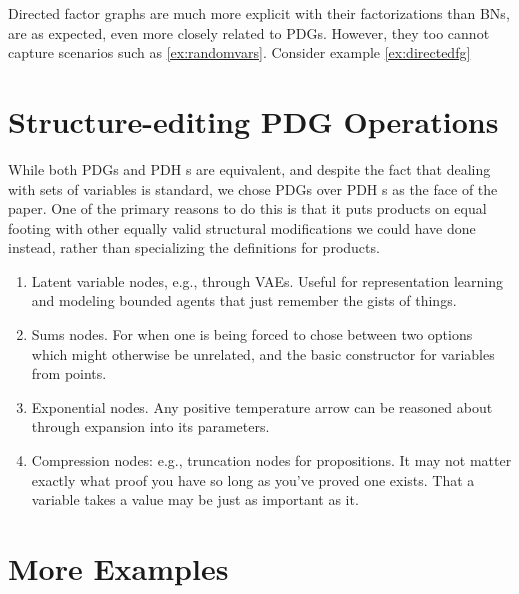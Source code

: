 {Directed factor graphs are much more explicit with their factorizations than BNs, are as expected, even more closely related to PDGs. However, they too cannot capture scenarios such as \cref{ex:randomvars}. Consider example \ref{ex:directedfg}

\begin{example}\label{ex:directedfg}
\end{example}





\section{Structure-editing PDG Operations}

While both PDGs and PDH s are equivalent, and despite the fact that dealing with sets of variables is standard, we chose PDGs over PDH s as the face of the paper. One of the primary reasons to do this is that it puts products on equal footing with other equally valid structural modifications we could have done instead, rather than specializing the definitions for products.

\begin{enumerate}
	\item Latent variable nodes, e.g., through VAEs. Useful for representation learning and modeling bounded agents that just remember the gists of things.
	
	\item Sums nodes. For when one is being forced to chose between two options which might otherwise be unrelated, and the basic constructor for variables from points.
	
	\item Exponential nodes. Any positive temperature arrow can be reasoned about through expansion into its parameters.
	
	\item Compression nodes: e.g., truncation nodes for propositions. It may not matter exactly what proof you have so long as you've proved one exists. That a variable takes a value may be just as important as it.
\end{enumerate}


\section{More Examples}\label{sec:more-examples}

}
